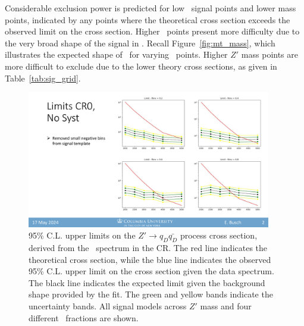 Considerable exclusion power is predicted for low \rinv~signal points and lower mass points, indicated by any points where the theoretical cross section exceeds the observed limit on the cross section.
Higher \rinv~points present more difficulty due to the very broad shape of the signal in \mt.
Recall Figure~\ref{fig:mt_mass}, which illustrates the expected shape of \mt~for varying \rinv~points.
Higher $Z'$ mass points are more difficult to exclude due to the lower theory cross sections, as given in Table~\ref{tab:sig_grid}.
\begin{figure}[!htbp]
\centering
   \includegraphics[width=0.95\textwidth]{figures/stats/limits_exp_1D}
    \caption{95\% C.L. upper limits on the $Z'\rightarrow q_D \bar{q_D}$ process cross section, derived from the \mt~spectrum in the CR. The red line indicates the theoretical cross section, while the blue line indicates the observed 95\% C.L. upper limit on the cross section given the data spectrum. The black line indicates the expected limit given the background shape provided by the fit. The green and yellow bands indicate the uncertainty bands. All signal models across $Z'$ mass and four different \rinv~fractions are shown. 
    \label{fig:limits_exp_1D}}
\end{figure}


